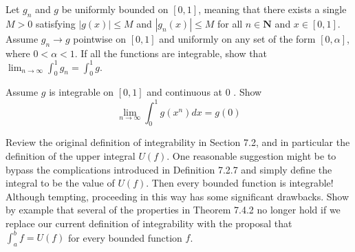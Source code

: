 \begin{exercise}
Let $g_{n}$ and $g$ be uniformly bounded on $[0,1]$, meaning that there exists a single $M>0$ satisfying $|g(x)| \leq M$ and $\left|g_{n}(x)\right| \leq M$ for all $n \in \mathbf{N}$ and $x \in[0,1]$. Assume $g_{n} \rightarrow g$ pointwise on $[0,1]$ and uniformly on any set of the form $[0, \alpha]$, where $0<\alpha<1$.
If all the functions are integrable, show that $\lim _{n \rightarrow \infty} \int_{0}^{1} g_{n}=\int_{0}^{1} g$.
\end{exercise}

\begin{solution}
    \TODO
\end{solution}

\begin{exercise} Assume $g$ is integrable on $[0,1]$ and continuous at 0 . Show
$$
\lim _{n \rightarrow \infty} \int_{0}^{1} g\left(x^{n}\right) d x=g(0)
$$
\end{exercise}
\begin{solution}
    \TODO
\end{solution}

\begin{exercise}
Review the original definition of integrability in Section 7.2, and in particular the definition of the upper integral $U(f)$. One reasonable suggestion might be to bypass the complications introduced in Definition 7.2.7 and simply define the integral to be the value of $U(f)$. Then every bounded function is integrable! Although tempting, proceeding in this way has some significant drawbacks. Show by example that several of the properties in Theorem 7.4.2 no longer hold if we replace our current definition of integrability with the proposal that $\int_{a}^{b} f=U(f)$ for every bounded function $f$.
\end{exercise}
\begin{solution}
    \TODO
\end{solution}
